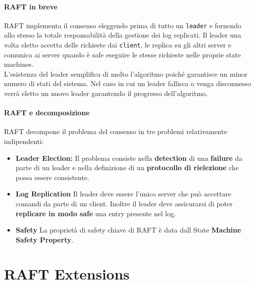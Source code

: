       \paragraph{RAFT in breve}
      RAFT implementa il consenso eleggendo prima di tutto un \texttt{leader} e fornendo allo stesso la totale responsabilità della gestione dei log replicati. Il leader una volta eletto accetta delle richieste dai \texttt{client}, le replica su gli altri server e comunica ai server quando è safe eseguire le stesse richieste nelle proprie state machines.\\
      L'esistenza del leader semplifica di molto l'algoritmo poiché garantisce un minor numero di stati del sistema. Nel caso in cui un leader fallisca o venga disconnesso verrà eletto un nuovo leader garantendo il progresso dell'algoritmo.

      \paragraph{RAFT e decomposizione}
      RAFT decompone il problema del consenso in tre problemi relativamente indipendenti:
      \begin{itemize}
        \item{\textbf{Leader Election:}}
        Il problema consiste nella \textbf{detection} di una \textbf{failure} da parte di un leader e nella definizione di un \textbf{protocollo di rielezione} che possa essere consistente.
        \item{\textbf{Log Replication}}
        Il leader deve essere l'unico server che può accettare comandi da parte di un client. Inoltre il leader deve assicurarsi di poter \textbf{replicare in modo safe} una entry presente nel log. 
        \item{\textbf{Safety}}
        La proprietà di safety chiave di RAFT è data dall State \textbf{Machine Safety Property}.
      \end{itemize}

		
		
		
		
	\section{RAFT Extensions}
		
		
		